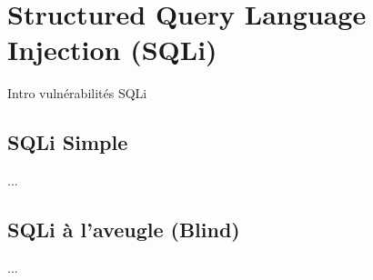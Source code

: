 

\newpage
\section{Structured Query Language Injection (SQLi)}\label{vulnerabilites:web:sqli}

Intro vulnérabilités SQLi

\subsection{SQLi Simple}\label{vulnerabilites:web:sqli:simple}

...

\subsection{SQLi à l'aveugle (Blind)}\label{vulnerabilites:web:sqli:blind}

...

\endinput

